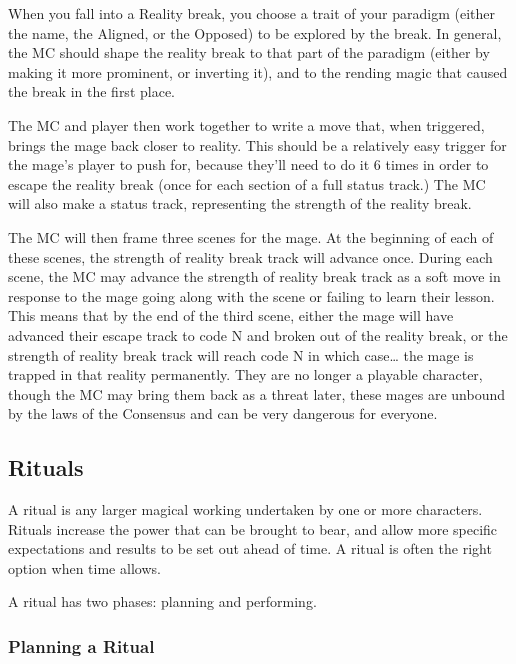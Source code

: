 \documentclass[
]{article}
\begin{document}
When you fall into a Reality break, you choose a trait of your paradigm
(either the name, the Aligned, or the Opposed) to be explored by the
break. In general, the MC should shape the reality break to that part of
the paradigm (either by making it more prominent, or inverting it), and
to the rending magic that caused the break in the first place.

The MC and player then work together to write a move that, when
triggered, brings the mage back closer to reality. This should be a
relatively easy trigger for the mage's player to push for, because
they'll need to do it 6 times in order to escape the reality break (once
for each section of a full status track.) The MC will also make a status
track, representing the strength of the reality break.

The MC will then frame three scenes for the mage. At the beginning of
each of these scenes, the strength of reality break track will advance
once. During each scene, the MC may advance the strength of reality
break track as a soft move in response to the mage going along with the
scene or failing to learn their lesson. This means that by the end of
the third scene, either the mage will have advanced their escape track
to code N and broken out of the reality break, or the strength of
reality break track will reach code N in which case\ldots{} the mage is
trapped in that reality permanently. They are no longer a playable
character, though the MC may bring them back as a threat later, these
mages are unbound by the laws of the Consensus and can be very dangerous
for everyone.

\hypertarget{rituals}{%
\subsection{Rituals}\label{rituals}}

A ritual is any larger magical working undertaken by one or more
characters. Rituals increase the power that can be brought to bear, and
allow more specific expectations and results to be set out ahead of
time. A ritual is often the right option when time allows.

A ritual has two phases: planning and performing.

\hypertarget{planning-a-ritual}{%
\subsubsection{Planning a Ritual}\label{planning-a-ritual}}
\end{document}

